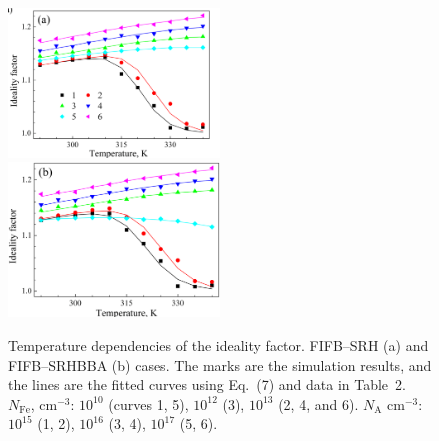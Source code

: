 \documentclass [sort&compress] {elsarticle}
\begin{document}
\begin{figure}
\includegraphics[width=0.5\textwidth]{FigS6a}%
\includegraphics[width=0.5\textwidth]{FigS6b}
\caption{\label{figS6}
Temperature dependencies of the ideality factor.
FIFB--SRH (a) and FIFB--SRHBBA (b) cases.
The marks are the simulation results, and the lines are the fitted curves using Eq.~(7) and data in Table~2.
$N_\mathrm{Fe}$, cm$^{-3}$: $10^{10}$ (curves 1, 5), $10^{12}$ (3), $10^{13}$ (2, 4, and 6).
$N_\mathrm{A}$ cm$^{-3}$: $10^{15}$ (1, 2), $10^{16}$ (3,  4), $10^{17}$ (5, 6).
}%
\end{figure}
\end{document}
